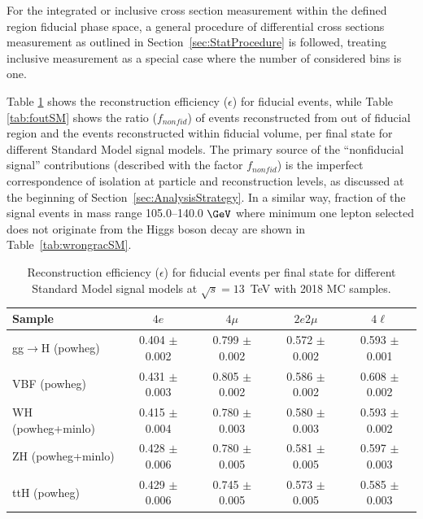 For the integrated or inclusive cross section measurement within the defined region fiducial phase space, a general procedure of differential cross sections measurement as outlined in Section~\ref{sec:StatProcedure} is followed, treating inclusive measurement as a special case where the number of considered bins is  one.
\par 
Table \ref{tab:efficiencySM} shows the reconstruction efficiency ($\epsilon$) for fiducial events, while Table \ref{tab:foutSM} shows the ratio ($f_{nonfid}$)
of events reconstructed from out of fiducial region and the events reconstructed within fiducial volume, per 
final state for different Standard Model signal models. The primary source of the ``nonfiducial signal'' contributions (described with the factor $f_{nonfid}$) 
is the imperfect correspondence of isolation at particle and reconstruction levels, as discussed at the beginning of
Section~\ref{sec:AnalysisStrategy}. 
In a similar way, fraction of the signal events in mass range 105.0--140.0 $\GeV$  where minimum one lepton selected does not originate from the Higgs boson decay are shown in Table~\ref{tab:wrongracSM}.

\begin{table}[!h!tb]
\begin{center}
\small
\caption{
Reconstruction efficiency ($\epsilon$) for fiducial events per final state for different Standard Model signal models at $\sqrt{s} =  13$~TeV with 2018 MC samples.
\label{tab:efficiencySM}
}
\begin{tabular}{|l|c|c|c|c|} \hline
Sample & $4e$ & $4\mu$ & $2e2\mu$ & $4\ell$ \\ \hline
gg$\rightarrow$H ({\sc powheg})  & 0.404 $\pm$ 0.002 & 0.799 $\pm$ 0.002 & 0.572 $\pm$ 0.002 & 0.593 $\pm$ 0.001 \\
VBF ({\sc powheg})  & 0.431 $\pm$ 0.003 & 0.805 $\pm$ 0.002 & 0.586 $\pm$ 0.002 & 0.608 $\pm$ 0.002 \\
WH ({\sc powheg+minlo}) & 0.415 $\pm$ 0.004 & 0.780 $\pm$ 0.003 & 0.580 $\pm$ 0.003 & 0.593 $\pm$ 0.002 \\
ZH ({\sc powheg+minlo})  & 0.428 $\pm$ 0.006 & 0.780 $\pm$ 0.005 & 0.581 $\pm$ 0.005 & 0.597 $\pm$ 0.003 \\
ttH ({\sc powheg}) & 0.429 $\pm$ 0.006 & 0.745 $\pm$ 0.005 & 0.573 $\pm$ 0.005 & 0.585 $\pm$ 0.003 \\
\hline
\end{tabular}
\normalsize
\end{center}
\end{table}

